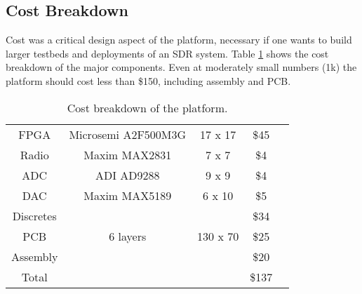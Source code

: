 %

\subsection{Cost Breakdown}

Cost was a critical design aspect of the \sdr platform, necessary if one wants
to build larger testbeds and deployments of an SDR system. Table
\ref{tab:cost} shows the cost breakdown of the major \sdr components.  Even at
moderately small numbers (1k) the \sdr platform should cost less than \$150,
including assembly and PCB. 

\begin{table}[thb]\small
	\centering
	\begin{tabular}{|c|c|c|c|c|} \hline
	\rowcolor[gray]{0}
	  {\sc {\color{white} Desc}}
	& {\sc {\color{white} Part number}}
	& {\sc {\color{white} Size (mm)}}
	& {\sc {\color{white} Cost (1k)}}
	\\ \hline
	FPGA    & Microsemi A2F500M3G   & 17 x 17   & \$45 	\\ \hline
	Radio 	& Maxim MAX2831	        & 7 x 7     & \$4	\\ \hline
	ADC		& ADI	AD9288		    & 9 x 9     & \$4	\\ \hline
	DAC		& Maxim MAX5189 	    & 6 x 10    & \$5	\\ \hline
    Discretes &                     &           & \$34	\\ \hline
	PCB		& 6 layers      	    & 130 x 70  & \$25	\\ \hline
    Assembly &                      &           & \$20	\\ \hline\hline
	\rowcolor[gray]{.9}
    Total   &                       &           & \$137 \\ \hline
	\end{tabular}
	\caption{Cost breakdown of the \sdr platform.} 
	\label{tab:cost}
\end{table}

\begin{comment}
- High-level overview with block diagrams.
- AMBA bus memory map (ARM code, radio peripheral similar to SoCs with integrated RF)
-- Theoretic speed 16GBit/s. At 100 MHz bus speed, 3.2GBit/s more realistic (32-bit per clock cycle). But from current Section 4.2, we only get 37 MBit/s?
    o 48 MHz, 1 byte transfers, 4 cycles per transfer (+ transfer to RAM + start PDMA to done signal)
- How do we implement basic comm blocks (software vs. hw, correlators, filters, etc)
 -- (not building blocks that are available, rather how do you use this platform to build something)
- What kind of performance can we expect from it?
- What is the maximum bandwidth achievable (impulse response)
- How does it fit our defined requirements from intro?
-- Power Measurements of basic platform
-- Performance of blocks
\end{comment}
